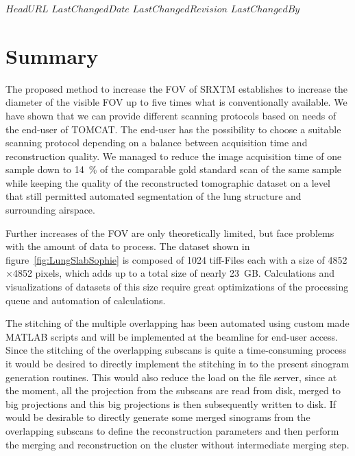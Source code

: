 \svnidlong
{$HeadURL$}
{$LastChangedDate$}
{$LastChangedRevision$}
{$LastChangedBy$}

\begin{center}
\end{center}

\section{Summary}
The proposed method to increase the FOV of SRXTM establishes to increase the diameter of the visible FOV up to five times what is conventionally available. We have shown that we can provide different scanning protocols based on needs of the end-user of TOMCAT. The end-user has the possibility to choose a suitable scanning protocol depending on a balance between acquisition time and reconstruction quality. We managed to reduce the image acquisition time of one sample down to \SI{14}{\percent} of the comparable gold standard scan of the same sample while keeping the quality of the reconstructed tomographic dataset on a level that still permitted automated segmentation of the lung structure and surrounding airspace.

Further increases of the FOV are only theoretically limited, but face problems with the amount of data to process. The dataset shown in figure~\ref{fig:LungSlabSophie} is composed of 1024 tiff-Files each with a size of 4852$\times$4852 pixels, which adds up to a total size of nearly \SI{23}{\giga B}. Calculations and visualizations of datasets of this size require great optimizations of the processing queue and automation of calculations.

The stitching of the multiple overlapping has been automated using custom made MATLAB scripts and will be implemented at the beamline for end-user access. Since the stitching of the overlapping subscans is quite a time-consuming process it would be desired to directly implement the stitching in to the present sinogram generation routines. This would also reduce the load on the file server, since at the moment, all the projection from the subscans are read from disk, merged to big projections and this big projections is then subsequently written to disk. If would be desirable to directly generate some merged sinograms from the overlapping subscans to define the reconstruction parameters and then perform the merging and reconstruction on the cluster without intermediate merging step.

